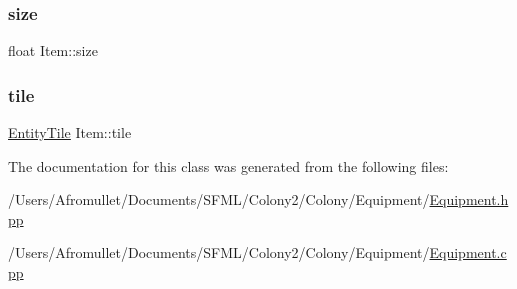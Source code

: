 \mbox{\label{class_item_af6193bebd888e699303f91bee96d9f16}} 
\subsubsection{\texorpdfstring{size}{size}}
{\footnotesize\ttfamily float Item\+::size\hspace{0.3cm}{\ttfamily [private]}}

\mbox{\label{class_item_a1784c30db978d4858e34cf812ff261d5}} 
\subsubsection{\texorpdfstring{tile}{tile}}
{\footnotesize\ttfamily \mbox{\hyperlink{class_entity_tile}{Entity\+Tile}} Item\+::tile}



The documentation for this class was generated from the following files\+:\begin{DoxyCompactItemize}
\item 
/\+Users/\+Afromullet/\+Documents/\+S\+F\+M\+L/\+Colony2/\+Colony/\+Equipment/\mbox{\hyperlink{_equipment_8hpp}{Equipment.\+hpp}}\item 
/\+Users/\+Afromullet/\+Documents/\+S\+F\+M\+L/\+Colony2/\+Colony/\+Equipment/\mbox{\hyperlink{_equipment_8cpp}{Equipment.\+cpp}}\end{DoxyCompactItemize}
